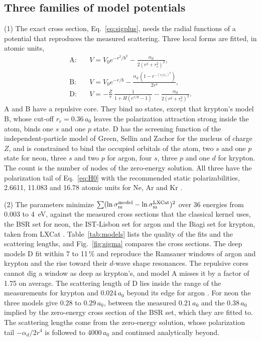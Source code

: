 \documentclass[11pt]{article}
\numberwithin{equation}{section}
\newcommand{\sm}{\sigma_{\rm m}}
\begin{document}
\subsection{Three families of model potentials}
{\noindent}(1) The exact cross section, Eq.~\eqref{eq:sigplus}, needs the
radial functions of a potential that reproduces the measured scattering. Three
local forms are fitted, in atomic units,
\begin{align}
\text{A:}\quad&V=V_0e^{-r^2/b^2}-\frac{\alpha_d}{2(r^2+r_c^2)^2},\nonumber\\
\text{B:}\quad&V=V_0e^{-r/b}-\frac{\alpha_d\,(1-e^{-(r/r_c)^6})}{2r^4},\label{eq:models}\\
\text{D:}\quad&V=-\frac{Z}{r}\,\frac{1}{1+H(e^{r/d}-1)}-\frac{\alpha_d}{2(r^2+r_c^2)^2}.\nonumber
\end{align}
A and B have a repulsive core. They bind no states, except that krypton's
model B, whose cut-off $r_c=0.36\,a_0$ leaves the polarization attraction
strong inside the atom, binds one $s$ and one $p$ state. D has the screening
function
of the independent-particle model of Green, Sellin and Zachor \cite{GSZ1969} for
the nucleus of charge $Z$, and is constrained to bind the occupied orbitals of
the atom, two $s$ and one $p$ state for neon, three $s$ and two $p$ for argon,
four $s$, three $p$ and one $d$ for krypton. The count is the number of nodes
of the zero-energy solution. All three have the polarization tail of
Eq.~\eqref{eq:H0} with the recommended static polarizabilities, 2.6611, 11.083
and 16.78 atomic units for Ne, Ar and Kr \cite{Schwerdtfeger2019}.

{\noindent}(2) The parameters minimize $\sum(\ln\sm^{\rm model}-\ln\sm^{\rm LXCat})^2$
over 36 energies from 0.003 to 4~eV, against the measured cross sections
that the classical kernel uses, the BSR set for neon, the
IST-Lisbon set for argon and the Biagi set for krypton, taken from LXCat
\cite{LXCat}. Table~\ref{tab:models} lists the quality of the fits and the
scattering lengths, and Fig.~\ref{fig:sigma} compares the cross sections.
The deep models D fit within 7 to 11\,\% and reproduce the Ramsauer windows of
argon and krypton and the rise toward their $d$-wave shape resonances. The
repulsive cores cannot dig a window as deep as krypton's, and model A misses it
by a factor of 1.75 on average. The scattering length of D lies inside the
range of the measurements for krypton and $0.024\,a_0$ beyond its edge for argon
\cite{Kurokawa2011,BuckmanMitroy1989,Kitajima2015}. For neon the three models
give $0.28$ to $0.29\,a_0$, between the measured $0.21\,a_0$
\cite{OMalleyCrompton1980} and the $0.38\,a_0$ implied by the zero-energy cross
section of the BSR set, which they are fitted to. The scattering lengths come
from the zero-energy solution, whose polarization tail $-\alpha_d/2r^4$ is
followed to $4000\,a_0$ and continued analytically beyond.
\end{document}

